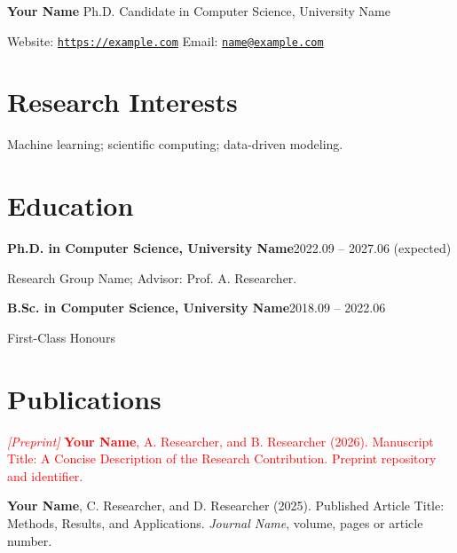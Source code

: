 \documentclass[a4paper,10pt]{article}
\makeatletter
\newcommand{\email}{name@example.com}
\newcommand{\website}{https://example.com}
\newcommand{\addspace}{\vspace{2pt}}
\makeatother
\begin{document}
\fontsize{11}{12.5}\selectfont

{\fontsize{19}{0}\selectfont\bfseries Your Name}
\hfill {\fontsize{13}{0}\selectfont Ph.D. Candidate in Computer Science, University Name}\par
\addspace
{\fontsize{12}{16}\selectfont
Website: \href{\website}{\texttt{\website}}
\hfill Email: \href{mailto:\email}{\texttt{\email}}\par}

\section*{Research Interests}
Machine learning; scientific computing; data-driven modeling.

\section*{Education}
\textbf{Ph.D. in Computer Science, University Name}\hfill 2022.09 -- 2027.06 (expected)\par
\hspace*{1em}Research Group Name; Advisor: Prof. A. Researcher.\par
\textbf{B.Sc. in Computer Science, University Name}\hfill 2018.09 -- 2022.06\par
\hspace*{1em}First-Class Honours\par

\section*{Publications}
\begin{enumerate}[label={[\arabic*]},leftmargin=1.8em,labelsep=0.4em,
  topsep=1pt,itemsep=3pt,parsep=0pt,partopsep=0pt]
  \item \textcolor{red}{\textit{[Preprint]} \textbf{Your Name}, A. Researcher, and B. Researcher (2026).
    Manuscript Title: A Concise Description of the Research Contribution.
    Preprint repository and identifier.}
  \item \textbf{Your Name}, C. Researcher, and D. Researcher (2025).
    Published Article Title: Methods, Results, and Applications.
    \textit{Journal Name}, volume, pages or article number.
\end{enumerate}
\end{document}
